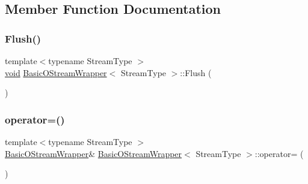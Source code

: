 \subsection{Member Function Documentation}
\mbox{\label{classBasicOStreamWrapper_a1c48a8b7520b0ab6ca34e665b928b56d}} 
\subsubsection{\texorpdfstring{Flush()}{Flush()}}
{\footnotesize\ttfamily template$<$typename Stream\+Type $>$ \\
\hyperlink{imgui__impl__opengl3__loader_8h_ac668e7cffd9e2e9cfee428b9b2f34fa7}{void} \hyperlink{classBasicOStreamWrapper}{Basic\+O\+Stream\+Wrapper}$<$ Stream\+Type $>$\+::Flush (\begin{DoxyParamCaption}{ }\end{DoxyParamCaption})\hspace{0.3cm}{\ttfamily [inline]}}

\mbox{\label{classBasicOStreamWrapper_a6c1ce774ea7c0cab85241320de26448c}} 
\subsubsection{\texorpdfstring{operator=()}{operator=()}}
{\footnotesize\ttfamily template$<$typename Stream\+Type $>$ \\
\hyperlink{classBasicOStreamWrapper}{Basic\+O\+Stream\+Wrapper}\& \hyperlink{classBasicOStreamWrapper}{Basic\+O\+Stream\+Wrapper}$<$ Stream\+Type $>$\+::operator= (\begin{DoxyParamCaption}\item[{const \hyperlink{classBasicOStreamWrapper}{Basic\+O\+Stream\+Wrapper}$<$ Stream\+Type $>$ \&}]{ }\end{DoxyParamCaption})\hspace{0.3cm}{\ttfamily [private]}}

\mbox{\label{classBasicOStreamWrapper_a6dc18ded82487d41a2d123e21a9e050b}} 
